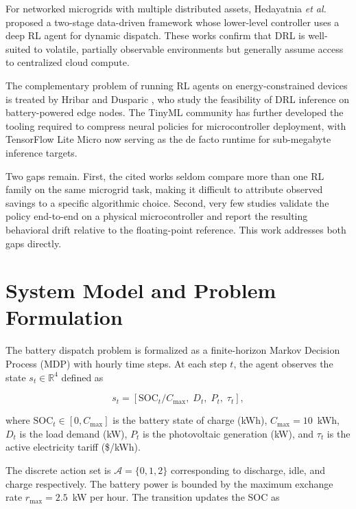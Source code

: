 \documentclass[conference]{IEEEtran}
\begin{document}
For networked microgrids with multiple distributed assets, Hedayatnia \textit{et al.} \cite{liu2020} proposed a two-stage data-driven framework whose lower-level controller uses a deep RL agent for dynamic dispatch. These works confirm that DRL is well-suited to volatile, partially observable environments but generally assume access to centralized cloud compute.

The complementary problem of running RL agents on energy-constrained devices is treated by Hribar and Dusparic \cite{wang2022}, who study the feasibility of DRL inference on battery-powered edge nodes. The TinyML community has further developed the tooling required to compress neural policies for microcontroller deployment, with TensorFlow Lite Micro \cite{david2021,warden2019} now serving as the de facto runtime for sub-megabyte inference targets.

Two gaps remain. First, the cited works seldom compare more than one RL family on the same microgrid task, making it difficult to attribute observed savings to a specific algorithmic choice. Second, very few studies validate the policy end-to-end on a physical microcontroller and report the resulting behavioral drift relative to the floating-point reference. This work addresses both gaps directly.

\section{System Model and Problem Formulation}
\label{sec:model}

The battery dispatch problem is formalized as a finite-horizon Markov Decision Process (MDP) \cite{sutton2018} with hourly time steps. At each step $t$, the agent observes the state $s_t \in \mathbb{R}^4$ defined as

\begin{equation}
    s_t = \left[ \mathrm{SOC}_t / C_{\max},\; D_t,\; P_t,\; \tau_t \right],
    \label{eq:state}
\end{equation}

where $\mathrm{SOC}_t \in [0, C_{\max}]$ is the battery state of charge (kWh), $C_{\max} = 10$~kWh, $D_t$ is the load demand (kW), $P_t$ is the photovoltaic generation (kW), and $\tau_t$ is the active electricity tariff (\$/kWh).

The discrete action set is $\mathcal{A} = \{0, 1, 2\}$ corresponding to discharge, idle, and charge respectively. The battery power is bounded by the maximum exchange rate $r_{\max} = 2.5$~kW per hour. The transition updates the SOC as
\end{document}
